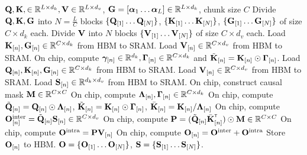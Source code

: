 \begin{algorithm}[b!]
\footnotesize
\caption{Forward pass for gated linear attention (w. materialization)}
\label{algo:gla-chunk-scan-1-fwd}
\begin{algorithmic}
    \Require ${\mathbf{Q}}, {\mathbf{K}}, \in \mathbb{R}^{L \times d_k}, {\mathbf{V}}  \in \mathbb{R}^{L \times d_v}$, ${\mathbf{G}} =[{\bm{\alpha}}_1 \dots {\bm{\alpha}}_L] \in \mathbb{R}^{L \times d_k}$, chunk size $C$
    \State Divide ${\mathbf{Q}}, {\mathbf{K}}, {\mathbf{G}}$ into $N = \frac{L}{C}$ blocks $\{ {\mathbf{Q}}_{[1]} \dots {\mathbf{Q}}_{[N]} \} $, $\{ {\mathbf{K}}_{[1]} \dots {\mathbf{K}}_{[N]} \}$, $\{ {\mathbf{G}}_{[1]} \dots {\mathbf{G}}_{[N]} \} $ of size $C \times d_k$ each.
    \State Divide ${\mathbf{V}}$ into $N$ blocks $\{ {\mathbf{V}}_{[1]} \dots {\mathbf{V}}_{[N]} \}$ of size $C \times d_v$ each.
        \State Load ${\mathbf{K}}_{[n]}, {\mathbf{G}}_{[n]} \in \mathbb{R}^{C \times d_k}$ from HBM to SRAM. 
        \State Load ${\mathbf{V}}_{[n]} \in \mathbb{R}^{C \times d_v}$ from HBM to SRAM.
        \State On chip, compute ${\bm{\gamma}}_{[n]} \in \mathbb{R}^{d_k}, {\mathbf{\Gamma}}_{[n]} \in \mathbb{R}^{C \times d_k}$ and $\tilde {{\mathbf{K}}}_{[n]} = {\mathbf{K}}_{[n]} \odot {\mathbf{\Gamma}}_{[n]}$. %
    \EndFor
        \State Load ${\mathbf{Q}}_{[n]}, {\mathbf{K}}_{[n]}, {\mathbf{G}}_{[n]} \in \mathbb{R}^{C \times d_k}$ from HBM to SRAM.
        \State Load ${\mathbf{V}}_{[n]}  \in \mathbb{R}^{C \times d_v}$ from HBM to SRAM.
        \State Load ${\mathbf{S}}_{[n]} \in \mathbb{R}^{d_k \times d_v}$ from HBM to SRAM.
        \State On chip, construct causal mask ${\mathbf{M}}\in \mathbb{R}^{C \times C}$ %
        \State On chip, compute ${\mathbf{\Lambda}}_{[n]}, {\mathbf{\Gamma}}_{[n]} \in \mathbb{R}^{C \times d_k}$
        \State On chip, compute $\tilde {{\mathbf{Q}}}_{[n]} = {\mathbf{Q}}_{[n]} \odot {\mathbf{\Lambda}}_{[n]}$, $\tilde {{\mathbf{K}}}_{[n]} = {\mathbf{K}}_{[n]} \odot {\mathbf{\Gamma}}_{[n]}$, $\bar {{\mathbf{K}}}_{[n]} = {\mathbf{K}}_{[n]} / {\mathbf{\Lambda}}_{[n]}$
        \State On chip, compute ${\mathbf{O}}_{[n]}^{\text{inter}} = \tilde {{\mathbf{Q}}}_{[n]} {\mathbf{S}}_{[n]} \in \mathbb{R}^{C \times d_v}$
        \State On chip, compute $\rmP = (\tilde \rmQ_{[n]} \bar \rmK^\intercal_{[n]})\odot \rmM  \in \R^{C \times C} $
        \State On chip, compute ${\mathbf{O}}^{\text{intra}} = {\mathbf{P}} {\mathbf{V}}_{[n]} $ 
        \State On chip, compute $ {\mathbf{O}}_{[n]} = {\mathbf{O}}^{\text{inter}} + {\mathbf{O}}^{\text{intra}} $
        \State Store ${\mathbf{O}}_{[n]}$ to HBM.
   \EndParFor
  \State \Return ${\mathbf{O}} = \{ {\mathbf{O}}_{[1]} \dots {\mathbf{O}}_{[N]} \}$, ${\mathbf{S}}=\{ {\mathbf{S}}_{[1]} \dots {\mathbf{S}}_{[N]} \}$.
\end{algorithmic}
\end{algorithm}
